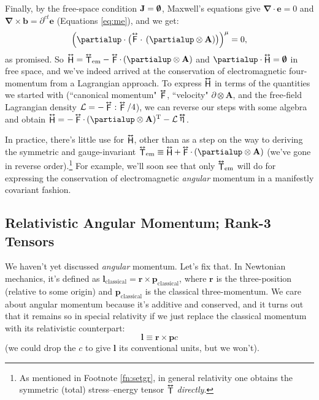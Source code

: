 \documentclass[12pt]{article}
\renewcommand{\vv}[1]{\mathbf{#1}}
\newcommand{\del}{\boldsymbol{\nabla}}
\newcommand{\tightoverset}[2]{%
  \mathop{#2}\limits^{\vbox to -.5ex{\kern-0.75ex\hbox{$#1$}\vss}}}
\newcommand{\inlinedy}[1]{\tightoverset{\text{\tiny$\bm\leftrightarrow$}}{#1}}
\newcommand{\capdy}[1]{ \overset{ \text{\tiny$\bm\leftrightarrow$} }{\vphantom{\text{\small{A}}}\smash{#1}} }
\begin{document}
Finally, by the free-space condition $\vv J = \textrm{\mbox{\boldmath $\emptyset$}}$, Maxwell's equations give $\del \cdot \vv e = 0$ and $\del \times \vv b = \partial^{ct} \vv e$ (Equations \ref{eq:me}), and we get:
\begin{equation*}
\Big( \partialup \cdot \big( \capdy{\mathsf{F}} \cdot \, ( \partialup \otimes \vv A ) \big) \Big)^{\mu} = 0 ,
\end{equation*}
as promised. So $\inlinedy{\mathsf{H}} = {\inlinedy{\mathsf{T}}}_{\textrm{em}} - \inlinedy{\mathsf{F}} \cdot \, ( \partialup \otimes \vv A )$ and $\partialup \cdot \inlinedy{\mathsf{H}} = \textrm{\mbox{\boldmath $\emptyset$}}$ in free space, and we've indeed arrived at the conservation of electromagnetic four-momentum from a Lagrangian approach. To express $\inlinedy{\mathsf{H}}$ in terms of the quantities we started with (``canonical momentum" $\inlinedy{\mathsf{F}}$, ``velocity" $ \partialup \otimes \vv A $, and the free-field Lagrangian density $\mathcal{L} = - \inlinedy{\mathsf{F}} : \inlinedy{\mathsf{F}} / 4$), we can reverse our steps with some algebra and obtain $\inlinedy{\mathsf{H}} = - \inlinedy{\mathsf{F}} \cdot \, ( \partialup \otimes \vv A) {}^{\mathrm{T}} - \mathcal{L} \inlinedy{\upeta}$.

In practice, there's little use for $\inlinedy{\mathsf{H}}$, other than as a step on the way to deriving the symmetric and gauge-invariant ${{\inlinedy{\mathsf{T}}}_{\textrm{em}} \equiv \inlinedy{\mathsf{H}} +  \inlinedy{\mathsf{F}} \cdot \, ( \partialup \otimes \vv A )}$ (we've gone in reverse order).\footnote{As mentioned in Footnote \ref{fn:setgr}, in general relativity one obtains the symmetric (total) stress--energy tensor $\inlinedy{\mathsf{T}}$ \emph{directly}.} For example, we'll soon see that only ${\inlinedy{\mathsf{T}}}_{\textrm{em}}$ will do for expressing the conservation of electromagnetic \emph{angular} momentum in a manifestly covariant fashion.

\subsection{Relativistic Angular Momentum; Rank-3 Tensors}

We haven't yet discussed \emph{angular} momentum. Let's fix that. In Newtonian mechanics, it's defined as $\vv l_{\mathrm{classical}} = \vv r \times \vv p_{\mathrm{classical}}$, where $\vv r$ is the three-position (relative to some origin) and $\vv p_{\mathrm{classical}}$ is the classical three-momentum. We care about angular momentum because it's additive and conserved, and it turns out that it remains so in special relativity if we just replace the classical momentum with its relativistic counterpart:
\begin{equation*}
\vv l \equiv \vv r \times \vv p c
\end{equation*}
(we could drop the $c$ to give $\vv l$ its conventional units, but we won't).
\end{document}
